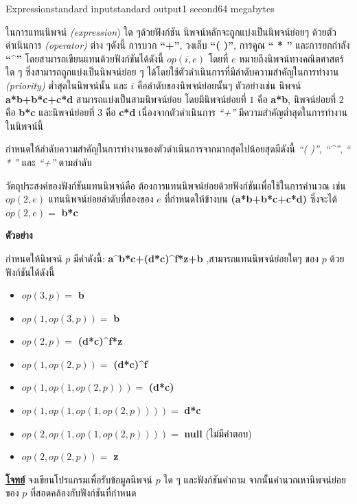 \documentclass[11pt,a4paper]{article}
\begin{document}
\begin{problem}{Expression}{standard input}{standard output}{1 second}{64 megabytes}

ในการแทนนิพจน์ \textit{(expression}) ใด ๆด้วยฟังก์ชัน นิพจน์หลักจะถูกแบ่งเป็นนิพจน์ย่อยๆ ด้วยตัวดำเนินการ \textit{(operator)} ต่าง ๆดังนี้ การบวก \textbf{“+”}, วงเล็บ \textbf{“( )”}, การคูณ \textbf{“ * ”} และการยกกำลัง \textbf{“\^{}”} โดยสามารถเขียนแทนด้วยฟังก์ชันได้ดังนี้ $op(i ,e)$ โดยที่ $e$ หมายถึงนิพจน์ทางคณิตศาสตร์ใด ๆ ซึ่งสามารถถูกแบ่งเป็นนิพจน์ย่อย ๆ ได้โดยใช้ตัวดำเนินการที่มีลำดับความสำคัญในการทำงาน \textit{(priority)} ต่ำสุดในนิพจน์นั้น และ $i$ คือลำดับของนิพจน์ย่อยนั้นๆ ตัวอย่างเช่น นิพจน์\textbf{ a*b+b*c+c*d }สามารถแบ่งเป็นสามนิพจน์ย่อย โดยมีนิพจน์ย่อยที่ $1$ คือ\textbf{ a*b}, นิพจน์ย่อยที่ $2$ คือ \textbf{b*c} และนิพจน์ย่อยที่ $3$ คือ \textbf{c*d} เนื่องจากตัวดำเนินการ \textit{“+”} มีความสำคัญต่ำสุดในการทำงานในนิพจน์นี้ 

กำหนดให้ลำดับความสำคัญในการทำงานของตัวดำเนินการจากมากสุดไปน้อยสุดมีดังนี้ \textit{“( )”}, \textit{“\^{}”}, \textit{“ * ”} และ \textit{“+”} ตามลำดับ

วัตถุประสงค์ของฟังก์ชันแทนนิพจน์คือ ต้องการแทนนิพจน์ย่อยด้วยฟังก์ชันเพื่อใช้ในการคำนวณ เช่น $op(2,e)$ แทนนิพจน์ย่อยลำดับที่สองของ $e$ ที่กำหนดให้ข้างบน \textbf{(a*b+b*c+c*d)} ซึ่งจะได้ $op(2,e)=$ \textbf{b*c}

\bigskip

\textbf{ตัวอย่าง}

กำหนดให้นิพจน์ $p$ มีค่าดังนี้: \textbf{a\^{}b*c+(d*c)\^{}f*z+b} ,สามารถแทนนิพจน์ย่อยใดๆ ของ $p$ ด้วยฟังก์ชันได้ดังนี้
\begin{itemize}

\item $op(3,p) =$ \textbf{b}
\item $op(1,op(3,p)) =$ \textbf{b}
\item $op(2,p) =$ \textbf{(d*c)\^{}f*z}
\item $op(1,op(2,p)) =$ \textbf{(d*c)\^{}f}
\item $op(1,op(1,op(2,p))) =$ \textbf{(d*c)}
\item $op(1,op(1,op(1,op(2,p)))) =$ \textbf{d*c}
\item $op(2,op(1,op(1,op(2,p)))) =$ \textbf{null} (ไม่มีคำตอบ)
\item $op(2,op(2,p)) =$ \textbf{z}
\end{itemize}

\underline{\textbf{โจทย์}}  จงเขียนโปรแกรมเพื่อรับข้อมูลนิพจน์ $p$ ใด ๆ และฟังก์ชันคำถาม จากนั้นคำนวณหานิพจน์ย่อยของ $p$ ที่สอดคล้องกับฟังก์ชันที่กำหนด




\end{problem}
\end{document}
